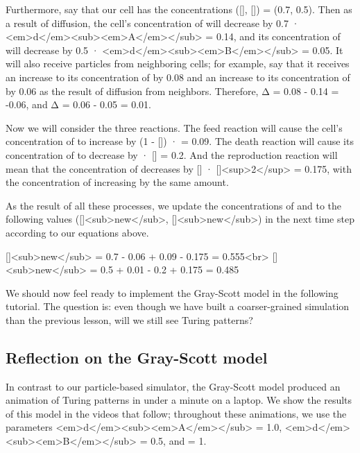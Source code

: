 {{Furthermore, say that our cell has the concentrations ([], []) = (0.7, 0.5). Then as a result of diffusion, the cell's concentration of  will decrease by 0.7 · <em>d</em><sub><em>A</em></sub> = 0.14, and its concentration of  will decrease by 0.5 · <em>d</em><sub><em>B</em></sub> = 0.05. It will also receive particles from neighboring cells; for example, say that it receives an increase to its concentration of  by 0.08 and an increase to its concentration of  by 0.06 as the result of diffusion from neighbors. Therefore, Δ = 0.08 - 0.14 = -0.06, and Δ = 0.06 - 0.05 = 0.01.

Now we will consider the three reactions. The feed reaction will cause the cell's concentration of  to increase by (1 - []) ·  = 0.09. The death reaction will cause its concentration of  to decrease by  · [] = 0.2. And the reproduction reaction will mean that the concentration of  decreases by [] · []<sup>2</sup> = 0.175, with the concentration of  increasing by the same amount.

As the result of all these processes, we update the concentrations of  and  to the following values ([]<sub>new</sub>, []<sub>new</sub>) in the next time step according to our equations above.

[]<sub>new</sub> = 0.7 - 0.06 + 0.09 - 0.175 = 0.555<br>
[]<sub>new</sub> = 0.5 + 0.01 - 0.2 + 0.175 = 0.485

We should now feel ready to implement the Gray-Scott model in the following tutorial. The question is: even though we have built a coarser-grained simulation than the previous lesson, will we still see Turing patterns?


\FloatBarrier
{}
\subsection{Reflection on the Gray-Scott model}

In contrast to our particle-based simulator, the Gray-Scott model produced an animation of Turing patterns in under a minute on a laptop. We show the results of this model in the videos that follow; throughout these animations, we use the parameters <em>d</em><sub><em>A</em></sub> = 1.0, <em>d</em><sub><em>B</em></sub> = 0.5, and  = 1.

}}
